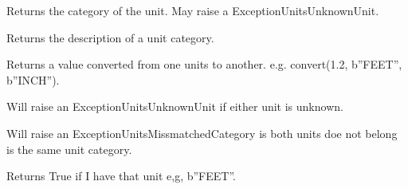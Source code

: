 \documentclass[letterpaper,10pt,english]{sphinxmanual}
\begin{document}

\begin{fulllineitems}
\label{\detokenize{ref/LIS/core/Units:TotalDepth.LIS.core.Units.category}}
Returns the category of the unit. May raise a ExceptionUnitsUnknownUnit.

\end{fulllineitems}


\begin{fulllineitems}
\label{\detokenize{ref/LIS/core/Units:TotalDepth.LIS.core.Units.categoryDescription}}
Returns the description of a unit category.

\end{fulllineitems}


\begin{fulllineitems}
\label{\detokenize{ref/LIS/core/Units:TotalDepth.LIS.core.Units.convert}}
Returns a value converted from one units to another. e.g. convert(1.2, b”FEET”, b”INCH”).

Will raise an ExceptionUnitsUnknownUnit if either unit is unknown.

Will raise an ExceptionUnitsMissmatchedCategory is both units doe not belong is the same unit category.

\end{fulllineitems}


\begin{fulllineitems}
\label{\detokenize{ref/LIS/core/Units:TotalDepth.LIS.core.Units.hasUnit}}
Returns True if I have that unit e,g, b”FEET”.

\end{fulllineitems}

\end{document}
